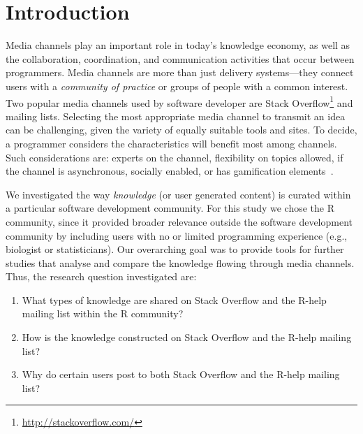 \section{Introduction}
\label{cha:introduction}


    Media channels play an important role in today's knowledge economy, as well as the collaboration, coordination, and communication activities that occur between programmers.
    Media channels are more than just delivery systems---they connect users with a \textit{community of practice} or groups of people with a common interest.
    Two popular media channels used by software developer are Stack Overflow\footnote{\url{http://stackoverflow.com/}} and mailing lists.
    Selecting the most appropriate media channel to transmit an idea can be challenging, given the variety of equally suitable tools and sites.
    To decide, a programmer considers the characteristics will benefit most among channels.
    Such considerations are: experts on the channel, flexibility on topics allowed, if the channel is asynchronous, socially enabled, or has gamification elements~\cite{Vasilescu2014c}.

    We investigated the way \textit{knowledge} (or user generated content) is curated within a particular software development community.
    For this study we chose the R community, since it provided broader relevance outside the software development community by including users with no or limited programming experience (e.g., biologist or statisticians).
    Our overarching goal was to provide tools for further studies that analyse and compare the knowledge flowing through media channels.
    Thus, the research question investigated are:

    \begin{enumerate}[label=\bfseries{RQ-\arabic*.},itemsep=3pt, topsep=2pt, leftmargin=3em, parsep=0pt]
        \item What types of knowledge are shared on Stack Overflow and the R-help mailing list within the R community?
        \item How is the knowledge constructed on Stack Overflow and the R-help mailing list? 
        \item Why do certain users post to both Stack Overflow and the R-help mailing list?
    \end{enumerate}

